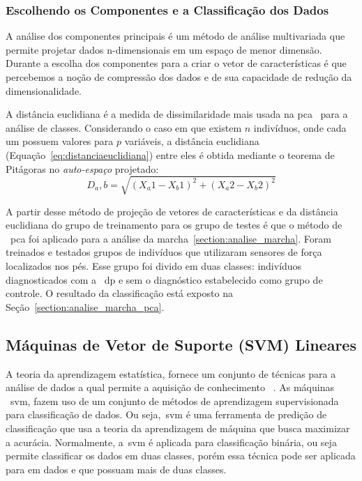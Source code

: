 \subsubsection{Escolhendo os Componentes e a Classificação dos Dados}
A análise dos componentes principais é um método de análise multivariada que permite projetar dados n-dimensionais em um espaço de menor dimensão. Durante a escolha dos componentes para a criar o vetor de características é que percebemos a noção de compressão dos dados e de sua capacidade de redução da dimensionalidade. 

A distância euclidiana é a medida de dissimilaridade mais usada na \ac{pca}~\cite{vicini2005} para a análise de classes. Considerando o caso em que existem $ n $ indivíduos, onde cada um possuem valores para $ p $ variáveis, a distância euclidiana (Equação~\ref{eq:distanciaeuclidiana}) entre eles é obtida mediante o teorema de Pitágoras no \textit{auto-espaço} projetado: 
\begin{equation}
D_a,b=\sqrt{(X_a1-X_b1)^2+(X_a2-X_b2)^2}
\label{eq:distanciaeuclidiana}
\end{equation}

A partir desse método de projeção de vetores de características e da distância euclidiana do grupo de treinamento para os grupo de testes é que o método de ~\ac{pca} foi aplicado para a análise da marcha~\ref{section:analise_marcha}. Foram treinados e testados grupos de indivíduos que utilizaram sensores de força localizados nos pés. Esse grupo foi divido em duas classes: indivíduos diagnosticados com a ~\ac{dp} e sem o diagnóstico estabelecido como grupo de controle. O resultado da classificação está exposto na Seção~\ref{section:analise_marcha_pca}. 

\subsection{Máquinas de Vetor de Suporte (SVM) Lineares}\label{sec:svm_linear}
A teoria da aprendizagem estatística, fornece um conjunto de técnicas para a análise de dados a qual permite a aquisição de conhecimento ~\cite{vapnik95}. As máquinas ~\ac{svm}, fazem uso de um conjunto de métodos de aprendizagem supervisionada para classificação de dados. Ou seja,~\ac{svm} é uma ferramenta de predição de classificação que usa a teoria da aprendizagem de máquina que busca maximizar a acurácia. Normalmente, a~\ac{svm} é aplicada para classificação binária, ou seja permite classificar os dados em duas classes, porém essa técnica pode ser aplicada para em dados e que possuam mais de duas classes.

